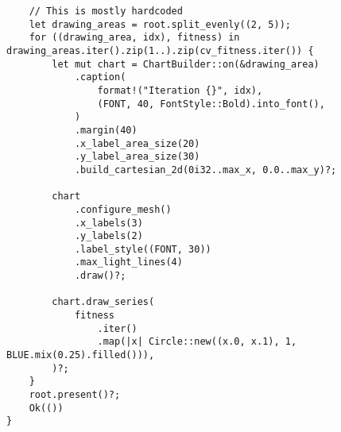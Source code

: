 \begin{code}
\begin{verbatim}
    // This is mostly hardcoded
    let drawing_areas = root.split_evenly((2, 5));
    for ((drawing_area, idx), fitness) in drawing_areas.iter().zip(1..).zip(cv_fitness.iter()) {
        let mut chart = ChartBuilder::on(&drawing_area)
            .caption(
                format!("Iteration {}", idx),
                (FONT, 40, FontStyle::Bold).into_font(),
            )
            .margin(40)
            .x_label_area_size(20)
            .y_label_area_size(30)
            .build_cartesian_2d(0i32..max_x, 0.0..max_y)?;

        chart
            .configure_mesh()
            .x_labels(3)
            .y_labels(2)
            .label_style((FONT, 30))
            .max_light_lines(4)
            .draw()?;

        chart.draw_series(
            fitness
                .iter()
                .map(|x| Circle::new((x.0, x.1), 1, BLUE.mix(0.25).filled())),
        )?;
    }
    root.present()?;
    Ok(())
}

\end{verbatim}
\end{code}

